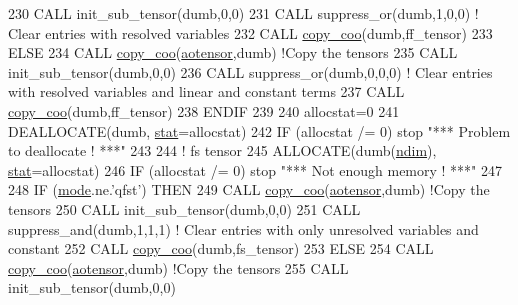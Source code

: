 \begin{DoxyCode}
230         \textcolor{keyword}{CALL }init\_sub\_tensor(dumb,0,0)
231         \textcolor{keyword}{CALL }suppress\_or(dumb,1,0,0) \textcolor{comment}{! Clear entries with resolved variables}
232         \textcolor{keyword}{CALL }\hyperlink{namespacetensor_a14f95c256cdf137ca0767ddb3c87deea}{copy\_coo}(dumb,ff\_tensor)
233     \textcolor{keywordflow}{ELSE}
234         \textcolor{keyword}{CALL }\hyperlink{namespacetensor_a14f95c256cdf137ca0767ddb3c87deea}{copy\_coo}(\hyperlink{namespaceaotensor__def_a0dc43bc9294a18f2fe57b67489f1702f}{aotensor},dumb) \textcolor{comment}{!Copy the tensors}
235         \textcolor{keyword}{CALL }init\_sub\_tensor(dumb,0,0)
236         \textcolor{keyword}{CALL }suppress\_or(dumb,0,0,0) \textcolor{comment}{! Clear entries with resolved variables and linear and constant terms}
237         \textcolor{keyword}{CALL }\hyperlink{namespacetensor_a14f95c256cdf137ca0767ddb3c87deea}{copy\_coo}(dumb,ff\_tensor)
238 \textcolor{keywordflow}{    ENDIF}
239 
240     allocstat=0
241     \textcolor{keyword}{DEALLOCATE}(dumb, \hyperlink{namespacestat}{stat}=allocstat)
242     \textcolor{keywordflow}{IF} (allocstat /= 0)  stop \textcolor{stringliteral}{"*** Problem to deallocate ! ***"}
243 
244     \textcolor{comment}{! fs tensor}
245     \textcolor{keyword}{ALLOCATE}(dumb(\hyperlink{namespaceparams_a2323fe1773f086e20c14f266351c482b}{ndim}), \hyperlink{namespacestat}{stat}=allocstat)
246     \textcolor{keywordflow}{IF} (allocstat /= 0) stop \textcolor{stringliteral}{"*** Not enough memory ! ***"}
247 
248     \textcolor{keywordflow}{IF} (\hyperlink{namespacestoch__params_a2c3f6439fd2d66413d065b533f2a6263}{mode}.ne.\textcolor{stringliteral}{'qfst'}) \textcolor{keywordflow}{THEN}
249         \textcolor{keyword}{CALL }\hyperlink{namespacetensor_a14f95c256cdf137ca0767ddb3c87deea}{copy\_coo}(\hyperlink{namespaceaotensor__def_a0dc43bc9294a18f2fe57b67489f1702f}{aotensor},dumb) \textcolor{comment}{!Copy the tensors}
250         \textcolor{keyword}{CALL }init\_sub\_tensor(dumb,0,0)
251         \textcolor{keyword}{CALL }suppress\_and(dumb,1,1,1) \textcolor{comment}{! Clear entries with only unresolved variables and constant}
252         \textcolor{keyword}{CALL }\hyperlink{namespacetensor_a14f95c256cdf137ca0767ddb3c87deea}{copy\_coo}(dumb,fs\_tensor)
253     \textcolor{keywordflow}{ELSE}
254         \textcolor{keyword}{CALL }\hyperlink{namespacetensor_a14f95c256cdf137ca0767ddb3c87deea}{copy\_coo}(\hyperlink{namespaceaotensor__def_a0dc43bc9294a18f2fe57b67489f1702f}{aotensor},dumb) \textcolor{comment}{!Copy the tensors}
255         \textcolor{keyword}{CALL }init\_sub\_tensor(dumb,0,0)

\end{DoxyCode}
